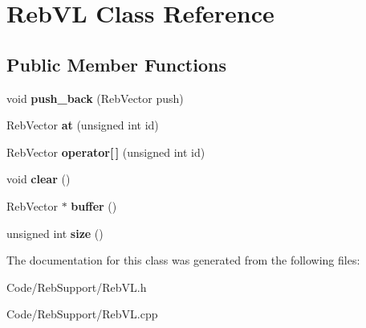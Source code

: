 \hypertarget{class_reb_v_l}{}\section{Reb\+VL Class Reference}
\label{class_reb_v_l}
\subsection*{Public Member Functions}
\begin{DoxyCompactItemize}
\item 
void {\bfseries push\+\_\+back} (Reb\+Vector push)\hypertarget{class_reb_v_l_ac0e251b9e38d51a913dc4bc79bcf8352}{}\label{class_reb_v_l_ac0e251b9e38d51a913dc4bc79bcf8352}

\item 
Reb\+Vector {\bfseries at} (unsigned int id)\hypertarget{class_reb_v_l_a80f0235f38dce3534dc5c7910c9addfc}{}\label{class_reb_v_l_a80f0235f38dce3534dc5c7910c9addfc}

\item 
Reb\+Vector {\bfseries operator\mbox{[}$\,$\mbox{]}} (unsigned int id)\hypertarget{class_reb_v_l_a0385eb76bff9fca3dad64b983f0cbfa5}{}\label{class_reb_v_l_a0385eb76bff9fca3dad64b983f0cbfa5}

\item 
void {\bfseries clear} ()\hypertarget{class_reb_v_l_aa641fc17e5e68129e45dc68a79923b8c}{}\label{class_reb_v_l_aa641fc17e5e68129e45dc68a79923b8c}

\item 
Reb\+Vector $\ast$ {\bfseries buffer} ()\hypertarget{class_reb_v_l_a8a029c60b7367a8f95a255599762c9c7}{}\label{class_reb_v_l_a8a029c60b7367a8f95a255599762c9c7}

\item 
unsigned int {\bfseries size} ()\hypertarget{class_reb_v_l_a272de2c0dfa5c864b014609ecade5724}{}\label{class_reb_v_l_a272de2c0dfa5c864b014609ecade5724}

\end{DoxyCompactItemize}


The documentation for this class was generated from the following files\+:\begin{DoxyCompactItemize}
\item 
Code/\+Reb\+Support/Reb\+V\+L.\+h\item 
Code/\+Reb\+Support/Reb\+V\+L.\+cpp\end{DoxyCompactItemize}
